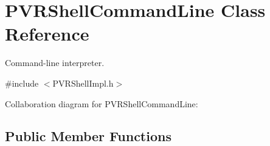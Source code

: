 \hypertarget{class_p_v_r_shell_command_line}{\section{P\+V\+R\+Shell\+Command\+Line Class Reference}
\label{class_p_v_r_shell_command_line}
}


Command-\/line interpreter.  




{\ttfamily \#include $<$P\+V\+R\+Shell\+Impl.\+h$>$}



Collaboration diagram for P\+V\+R\+Shell\+Command\+Line\+:
\subsection*{Public Member Functions}
